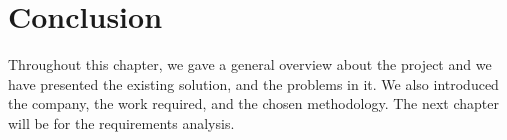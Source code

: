 \section*{Conclusion}
Throughout this chapter, we gave a general overview about the project and we have
presented the existing solution, and the problems in it. We also introduced the company, the work required, and
the chosen methodology. The next chapter will be for the requirements analysis.
